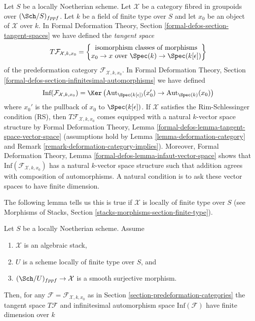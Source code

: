 \noindent
Let $S$ be a locally Noetherian scheme. Let $\mathcal{X}$ be a category
fibred in groupoids over $(\Sch/S)_{fppf}$. Let $k$ be a field of finite
type over $S$ and let $x_0$ be an object of $\mathcal{X}$ over $k$.
In Formal Deformation Theory, Section \ref{formal-defos-section-tangent-spaces}
we have defined the {\it tangent space}
\begin{equation}
\label{equation-tangent-space}
T\mathcal{F}_{\mathcal{X}, k, x_0} =
\left\{
\begin{matrix}
\text{isomorphism classes of morphisms}\\
x_0 \to x\text{ over }\Spec(k) \to \Spec(k[\epsilon])
\end{matrix}
\right\}
\end{equation}
of the predeformation category $\mathcal{F}_{\mathcal{X}, k, x_0}$.
In Formal Deformation Theory, Section
\ref{formal-defos-section-infinitesimal-automorphisms}
we have defined
\begin{equation}
\label{equation-infinitesimal-automorphisms}
\text{Inf}(\mathcal{F}_{\mathcal{X}, k, x_0}) =
\Ker\left(
\text{Aut}_{\Spec(k[\epsilon])}(x'_0) \to \text{Aut}_{\Spec(k)}(x_0)
\right)
\end{equation}
where $x_0'$ is the pullback of $x_0$ to $\Spec(k[\epsilon])$.
If $\mathcal{X}$ satisfies the Rim-Schlessinger condition (RS), then
$T\mathcal{F}_{\mathcal{X}, k, x_0}$ comes equipped with a natural
$k$-vector space structure by Formal Deformation Theory, Lemma
\ref{formal-defos-lemma-tangent-space-vector-space}
(assumptions hold by Lemma \ref{lemma-deformation-category} and
Remark \ref{remark-deformation-category-implies}). Moreover,
Formal Deformation Theory, Lemma \ref{formal-defos-lemma-infaut-vector-space}
shows that $\text{Inf}(\mathcal{F}_{\mathcal{X}, k, x_0})$ has a
natural $k$-vector space structure such that addition agrees with
composition of automorphisms. A natural condition
is to ask these vector spaces to have finite dimension.

\medskip\noindent
The following lemma tells us this is true if
$\mathcal{X}$ is locally of finite type over $S$ (see
Morphisms of Stacks, Section \ref{stacks-morphisms-section-finite-type}).

\begin{lemma}
\label{lemma-finite-dimension}
Let $S$ be a locally Noetherian scheme. Assume
\begin{enumerate}
\item $\mathcal{X}$ is an algebraic stack,
\item $U$ is a scheme locally of finite type over $S$, and
\item $(\Sch/U)_{fppf} \to \mathcal{X}$ is a smooth surjective
morphism.
\end{enumerate}
Then, for any $\mathcal{F} = \mathcal{F}_{\mathcal{X}, k, x_0}$ as in
Section \ref{section-predeformation-categories}
the tangent space $T\mathcal{F}$ and infinitesimal automorphism space
$\text{Inf}(\mathcal{F})$ have finite dimension over $k$
\end{lemma}

